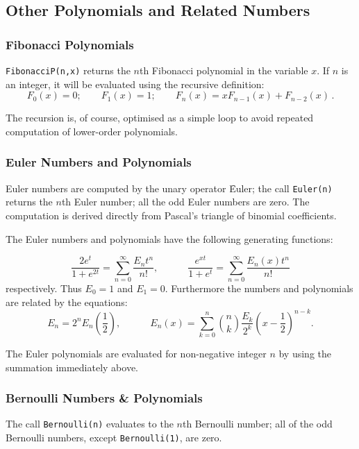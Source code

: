 \subsection{Other Polynomials and Related Numbers}

\subsubsection{Fibonacci Polynomials}
\hypertarget{FIBONACCIP}{}
\texttt{FibonacciP(n,x)} returns the $n$th Fibonacci polynomial
in the variable $x$. If $n$ is an integer, it will be
evaluated using the recursive definition:
$$F_0(x) = 0;\qquad F_1(x) = 1; \qquad F_n(x) = x F_{n-1}(x) + F_{n-2}(x)\,.$$

The recursion is, of course, optimised as a simple loop to avoid repeated
computation of lower-order polynomials.

\subsubsection{Euler Numbers and Polynomials}
\hypertarget{EULERP}{}
Euler numbers are computed by the unary operator \f{Euler}; the
call \texttt{Euler(n)} returns the $n$th Euler number; all the odd Euler
numbers are zero. The computation is
derived directly from Pascal's triangle of binomial coefficients.

The Euler numbers and polynomials have the following generating functions:

$$\frac {2e^t} {1+e^{2t}} = \sum_{n=0}^{\infty}\frac{E_nt^n}{n!},\qquad\quad
\frac {e^{x t}} {1+e^t} = \sum_{n=0}^{\infty}\frac{E_n(x)t^n}{n!}$$
respectively.  Thus $E_0=1$ and $E_1=0$. Furthermore the numbers and
polynomials are related by the equations:
$$ E_n = 2^nE_n\left(\frac{1}{2}\right),\qquad\quad
E_n(x) = \sum_{k=0}^n \binom{n}{k} \frac{E_k}{2^k} \left(x-\frac{1}{2}\right)^{n-k}.$$

The Euler polynomials are evaluated for non-negative integer $n$ by using
the summation immediately above.

\subsubsection{Bernoulli Numbers \& Polynomials}
\hypertarget{BERNOULLIP}{}
The call \texttt{Bernoulli(n)}
evaluates to the $n$th Bernoulli number;
all of the odd Bernoulli numbers, except \texttt{Bernoulli(1)}, are
zero.

